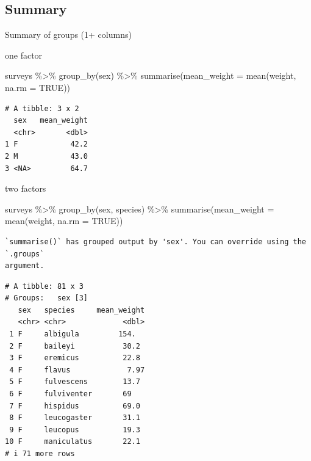 \documentclass[
  letterpaper,
  DIV=11,
  numbers=noendperiod]{scrreprt}
\newenvironment{Shaded}{\begin{snugshade}}{\end{snugshade}}
\newcommand{\AttributeTok}[1]{\textcolor[rgb]{0.40,0.45,0.13}{#1}}
\newcommand{\ConstantTok}[1]{\textcolor[rgb]{0.56,0.35,0.01}{#1}}
\newcommand{\FunctionTok}[1]{\textcolor[rgb]{0.28,0.35,0.67}{#1}}
\newcommand{\NormalTok}[1]{\textcolor[rgb]{0.00,0.23,0.31}{#1}}
\newcommand{\SpecialCharTok}[1]{\textcolor[rgb]{0.37,0.37,0.37}{#1}}
\begin{document}
\subsection{Summary}\label{summary}

Summary of groups (1+ columns)

one factor

\begin{Shaded}
\begin{Highlighting}[]
\NormalTok{surveys }\SpecialCharTok{\%\textgreater{}\%}
  \FunctionTok{group\_by}\NormalTok{(sex) }\SpecialCharTok{\%\textgreater{}\%}
  \FunctionTok{summarise}\NormalTok{(}\AttributeTok{mean\_weight =} \FunctionTok{mean}\NormalTok{(weight, }\AttributeTok{na.rm =} \ConstantTok{TRUE}\NormalTok{))}
\end{Highlighting}
\end{Shaded}

\begin{verbatim}
# A tibble: 3 x 2
  sex   mean_weight
  <chr>       <dbl>
1 F            42.2
2 M            43.0
3 <NA>         64.7
\end{verbatim}

two factors

\begin{Shaded}
\begin{Highlighting}[]
\NormalTok{surveys }\SpecialCharTok{\%\textgreater{}\%}
  \FunctionTok{group\_by}\NormalTok{(sex, species) }\SpecialCharTok{\%\textgreater{}\%}
  \FunctionTok{summarise}\NormalTok{(}\AttributeTok{mean\_weight =} \FunctionTok{mean}\NormalTok{(weight, }\AttributeTok{na.rm =} \ConstantTok{TRUE}\NormalTok{))}
\end{Highlighting}
\end{Shaded}

\begin{verbatim}
`summarise()` has grouped output by 'sex'. You can override using the `.groups`
argument.
\end{verbatim}

\begin{verbatim}
# A tibble: 81 x 3
# Groups:   sex [3]
   sex   species     mean_weight
   <chr> <chr>             <dbl>
 1 F     albigula         154.  
 2 F     baileyi           30.2 
 3 F     eremicus          22.8 
 4 F     flavus             7.97
 5 F     fulvescens        13.7 
 6 F     fulviventer       69   
 7 F     hispidus          69.0 
 8 F     leucogaster       31.1 
 9 F     leucopus          19.3 
10 F     maniculatus       22.1 
# i 71 more rows
\end{verbatim}
\end{document}
